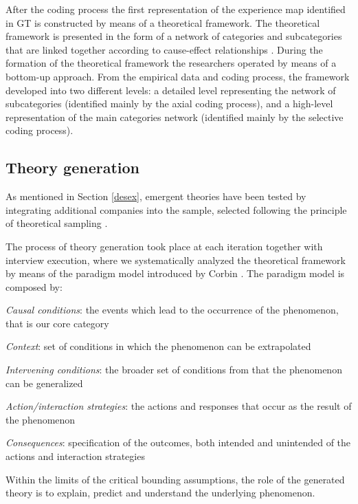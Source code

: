 \documentclass[12pt,journal,compsoc]{../sty/IEEEtran}
\begin{document}
\begin{table}[!t]
After the coding process the first representation of the experience map
identified in GT is constructed by means of a theoretical framework. The
theoretical framework is presented in the form of a network of categories and
subcategories that are linked together according to cause-effect relationships
\cite{Corbin1990}. During the formation of the theoretical framework the
researchers operated by means of a  bottom-up approach. From the empirical data
and coding process, the framework developed into two different levels: a
detailed level representing the network of subcategories (identified mainly by
the axial coding process), and a high-level representation of the main
categories network (identified mainly by the selective coding process).

\subsection{Theory generation}

As mentioned in Section \ref{desex}, emergent theories have been tested by
integrating additional companies into the sample, selected following the
principle of theoretical sampling \cite{Yin1994}.

The process of theory generation took place at each iteration together with
interview execution, where we systematically analyzed the theoretical framework
by means of the paradigm model introduced by Corbin \cite{Corbin1990}. The
paradigm model is composed by:

\begin{compactitem} \item \textit{Causal conditions}: the events which lead to
the occurrence of  the phenomenon, that is our core category \item
\textit{Context}: set of conditions in which the phenomenon can be  extrapolated
\item \textit{Intervening conditions}: the broader set of conditions from that
the phenomenon can be generalized \item \textit{Action/interaction strategies}:
the actions and responses that  occur as the result of the phenomenon \item
\textit{Consequences}: specification of the outcomes, both intended and
unintended of the actions and interaction strategies \end{compactitem}

Within the limits of the critical bounding assumptions, the role of the
generated theory is to explain, predict and understand the underlying
phenomenon.


\end{table}
\end{document}
